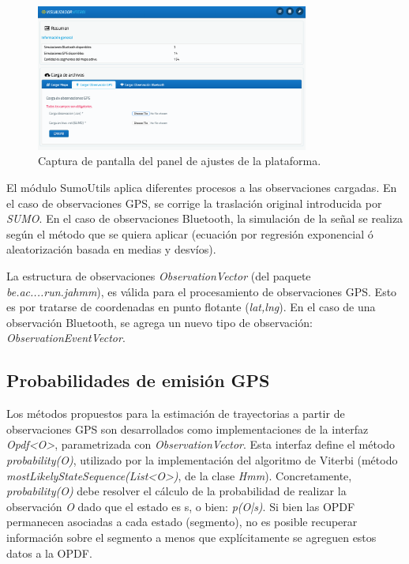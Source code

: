 \begin{figure}[!htp]
	\centering
	\includegraphics[width=0.8\textwidth]{images/captura-settings-gps.png}
	\captionsetup{width=0.8\textwidth}
	\caption{Captura de pantalla del panel de ajustes de la plataforma.}
    \label{fig:captura-settings-gps}
\end{figure}

El módulo SumoUtils aplica diferentes procesos a las observaciones cargadas. En el caso de observaciones GPS, se corrige la traslación original introducida por \textit{SUMO}. En el caso de observaciones Bluetooth, la simulación de la señal se realiza según el método que se quiera aplicar (ecuación por regresión exponencial ó  aleatorización basada en medias y desvíos).


La estructura de observaciones \textit{ObservationVector} (del paquete \textit{be.ac....run.jahmm}), es válida para el procesamiento de observaciones GPS. Esto es por tratarse de coordenadas en punto flotante (\textit{lat,lng}). En el caso de una observación Bluetooth, se agrega un nuevo tipo de observación: \textit{ObservationEventVector}. 

\subsection{Probabilidades de emisión GPS}

Los métodos propuestos para la estimación de trayectorias a partir de observaciones GPS son desarrollados como implementaciones de la interfaz \textit{Opdf<O>}, parametrizada con \textit{ObservationVector}. Esta interfaz define el método \textit{probability(O)}, utilizado por la implementación del algoritmo de Viterbi (método \textit{mostLikelyStateSequence(List<O>)}, de la clase \textit{Hmm}). Concretamente, 
\textit{probability(O)} debe resolver el cálculo de la probabilidad de realizar la observación \textit{O} dado que el estado es s, o bien: \textit{p(O|s)}. Si bien las OPDF permanecen asociadas a cada estado (segmento), no es posible recuperar información sobre el segmento a menos que explícitamente se agreguen estos datos a la OPDF. 


